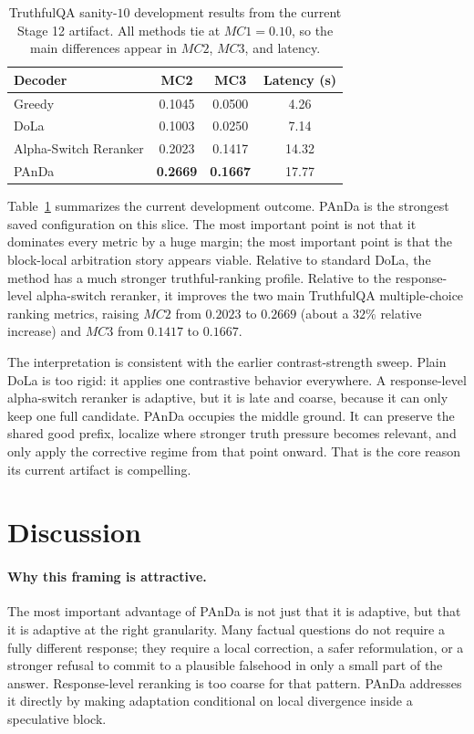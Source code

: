 \documentclass[10pt,twocolumn]{article}
\begin{document}
\begin{table}[t]
\centering
\footnotesize
\begin{tabular}{lccc}
\toprule
Decoder & MC2 & MC3 & Latency (s) \\
\midrule
Greedy & 0.1045 & 0.0500 & 4.26 \\
DoLa & 0.1003 & 0.0250 & 7.14 \\
Alpha-Switch Reranker & 0.2023 & 0.1417 & 14.32 \\
PAnDa & \textbf{0.2669} & \textbf{0.1667} & 17.77 \\
\bottomrule
\end{tabular}
\caption{TruthfulQA sanity-\(10\) development results from the current Stage 12 artifact. All methods tie at \(MC1 = 0.10\), so the main differences appear in \(MC2\), \(MC3\), and latency.}
\label{tab:panda-main}
\end{table}

Table~\ref{tab:panda-main} summarizes the current development outcome. PAnDa is the strongest saved configuration on this slice. The most important point is not that it dominates every metric by a huge margin; the most important point is that the block-local arbitration story appears viable. Relative to standard DoLa, the method has a much stronger truthful-ranking profile. Relative to the response-level alpha-switch reranker, it improves the two main TruthfulQA multiple-choice ranking metrics, raising \(MC2\) from \(0.2023\) to \(0.2669\) (about a \(32\%\) relative increase) and \(MC3\) from \(0.1417\) to \(0.1667\).

The interpretation is consistent with the earlier contrast-strength sweep. Plain DoLa is too rigid: it applies one contrastive behavior everywhere. A response-level alpha-switch reranker is adaptive, but it is late and coarse, because it can only keep one full candidate. PAnDa occupies the middle ground. It can preserve the shared good prefix, localize where stronger truth pressure becomes relevant, and only apply the corrective regime from that point onward. That is the core reason its current artifact is compelling.

\section{Discussion}
\paragraph{Why this framing is attractive.}
The most important advantage of PAnDa is not just that it is adaptive, but that it is adaptive at the right granularity. Many factual questions do not require a fully different response; they require a local correction, a safer reformulation, or a stronger refusal to commit to a plausible falsehood in only a small part of the answer. Response-level reranking is too coarse for that pattern. PAnDa addresses it directly by making adaptation conditional on local divergence inside a speculative block.
\end{document}
